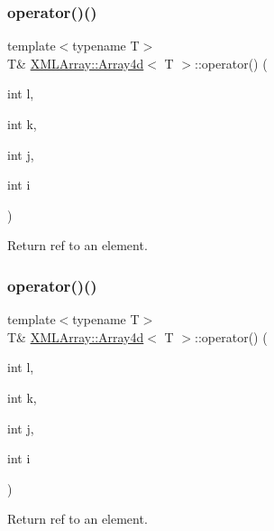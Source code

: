 \subsubsection{\texorpdfstring{operator()()}{operator()()}\hspace{0.1cm}{\footnotesize\ttfamily [1/6]}}
{\footnotesize\ttfamily template$<$typename T$>$ \\
T\& \mbox{\hyperlink{classXMLArray_1_1Array4d}{X\+M\+L\+Array\+::\+Array4d}}$<$ T $>$\+::operator() (\begin{DoxyParamCaption}\item[{int}]{l,  }\item[{int}]{k,  }\item[{int}]{j,  }\item[{int}]{i }\end{DoxyParamCaption})\hspace{0.3cm}{\ttfamily [inline]}}



Return ref to an element. 

\mbox{\label{classXMLArray_1_1Array4d_aed3f4e517b15358348150e8212189b60}} 
\subsubsection{\texorpdfstring{operator()()}{operator()()}\hspace{0.1cm}{\footnotesize\ttfamily [2/6]}}
{\footnotesize\ttfamily template$<$typename T$>$ \\
T\& \mbox{\hyperlink{classXMLArray_1_1Array4d}{X\+M\+L\+Array\+::\+Array4d}}$<$ T $>$\+::operator() (\begin{DoxyParamCaption}\item[{int}]{l,  }\item[{int}]{k,  }\item[{int}]{j,  }\item[{int}]{i }\end{DoxyParamCaption})\hspace{0.3cm}{\ttfamily [inline]}}



Return ref to an element. 

\mbox{\label{classXMLArray_1_1Array4d_aed3f4e517b15358348150e8212189b60}} 
